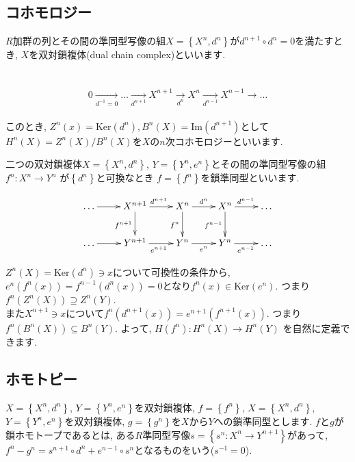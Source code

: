 \documentclass{jsarticle}
\def\Im{\mathrm{Im}}
\def\Ker{\mathrm{Ker}}
\theoremstyle{definition}
\numberwithin{theorem}{section}
\begin{document}
\subsection{コホモロジー}
$R$加群の列とその間の準同型写像の組$X = \left\{X^n, d^n\right\}$が$d^{n+1} \circ d^n = 0$を満たすとき, $X$を双対鎖複体(dual chain complex)といいます.

\hrulefill\\

\begin{eqnarray*}
\begin{aligned}
0 \xrightarrow[d^{-1} = 0]{} \ldots \xrightarrow[d^{n+1}]{} X^{n+1} \xrightarrow[d^n]{} X^n \xrightarrow[d^{n-1}]{} X^{n-1} \rightarrow \ldots
\end{aligned}
\end{eqnarray*}

このとき, $Z^n(x) = \Ker(d^n), B^n(X) = \Im(d^{n+1})$として$H^n(X) = Z^n(X)/B^n(X)$を$X$の$n$次コホモロジーといいます.

二つの双対鎖複体$X = \left\{X^n, d^n\right\}$, $Y = \left\{Y^n, e^n\right\}$とその間の準同型写像の組$f^n:X^n \rightarrow Y^n$
が$\left\{d^n\right\}$と可換なとき $f = \left\{f^n\right\}$を鎖準同型といいます.

\begin{equation*}
\xymatrix{
  \ldots \ar[r] & X^{n+1} \ar[r]^{d^{n+1}} \ar[d]_{f^{n+1}} & X^{n} \ar[r]^{d^n} \ar[d]_{f^{n}} & X^n \ar[r]^{d^{n-1}} \ar[d]_{f^{n-1}} & \ldots\\
  \ldots \ar[r] & Y^{n+1} \ar[r]_{e^{n+1}} & Y^{n} \ar[r]_{e^n} & Y^n \ar[r]_{e^{n-1}} & \ldots\\
}
\end{equation*}

$Z^n(X) = \Ker(d^n)\ni x$について可換性の条件から, $e^n(f^n(x)) = f^{n-1}(d^n(x)) = 0$となり$f^n(x) \in \Ker(e^n)$. つまり
$f^n(Z^n(X))\supseteq Z^n(Y)$.\\
また$X^{n+1}\ni x$について$f^n(d^{n+1}(x)) = e^{n+1}(f^{n+1}(x))$. つまり$f^n(B^n(X))\subseteq B^n(Y)$. よって, 
$H(f^n): H^n(X) \rightarrow H^n(Y)$ を自然に定義できます.

\subsection{ホモトピー}
\label{sc:homotopy}
$X=\left\{X^n, d^n\right\}$, $Y = \left\{Y^n, e^n\right\}$を双対鎖複体, $f=\left\{f^n\right\}$, $X=\left\{X^n, d^n\right\}$, $Y = \left\{Y^n, e^n\right\}$を双対鎖複体,
$g=\left\{g^n\right\}$を$X$から$Y$への鎖準同型とします. $f$と$g$が鎖ホモトープであるとは, ある$R$準同型写像$s=\left\{s^n: X^n\rightarrow Y^{n+1}\right\}$があって, 
$f^n-g^n = s^{n+1} \circ d^n+e^{n-1} \circ s^n$となるものをいう($s^{-1} = 0$).
\end{document}
